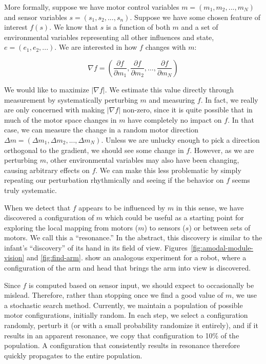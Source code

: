 More formally, suppose we have motor control variables
$m=(m_1,m_2,...,m_N)$ and sensor variables $s=(s_1,s_2,...,s_n)$.
Suppose we have some chosen feature of interest $f(s)$.  We know that
$s$ is a function of both $m$ and a set of environmental variables
representing all other influences and state, $e=(e_1,e_2,...)$.
We are interested in how $f$ changes with $m$:

\begin{equation}
\nabla f  = \left(\frac{\partial f}{\partial m_1 }, \frac{\partial f}{\partial m_2 }, \dots,  \frac{\partial f}{\partial m_N }  \right)
\end{equation}

We would like to maximize $|\nabla{}f|$.  We estimate this value
directly through measurement by systematically perturbing $m$ and
measuring $f$.
%
In fact, we really are only concerned with making $|\nabla{}f|$ 
non-zero, since it is quite possible that in much of the motor space 
changes in $m$ have completely no impact on $f$.
%
In that case, we can measure the change in a random motor 
direction $\Delta{}m=(\Delta{}m_1,\Delta{}m_2,...,\Delta{}m_N)$.
%
Unless we are unlucky enough to pick a direction orthogonal to 
the gradient, we should see some change in $f$.
%
However, as we are perturbing $m$, other environmental variables
may also have been changing, causing arbitrary effects on $f$.
We can make this less problematic by simply repeating our perturbation
rhythmically and seeing if the behavior on $f$ seems truly
systematic.

When we detect that $f$ appears to be influenced by $m$ in this
sense, we have discovered a configuration of $m$ which could
be useful as a starting point for exploring the local mapping
from motors ($m$) to sensors ($s$) or between sets of motors.
We call this a ``resonance.''
In the abstract, this discovery is similar to the 
infant's ``discovery'' of its hand in its field of view.
Figures~\ref{fig:amodal-module-vision} and \ref{fig:find-arm}.
show an analogous experiment for a robot, where a configuration
of the arm and head that brings the arm into view is discovered.

Since $f$ is computed based on sensor input, we should
expect to occasionally be mislead.  Therefore, rather 
than stopping once we find a good value of $m$, we use
a stochastic search method.  
%
Currently, we maintain a population of possible motor configurations,
initially random.  In each step, we select a configuration randomly,
perturb it (or with a small probability randomize it entirely), and if
it results in an apparent resonance, we copy that configuration to 10\%
of the population.
%
A configuration that consistently results in resonance therefore quickly 
propagates to the entire population.


